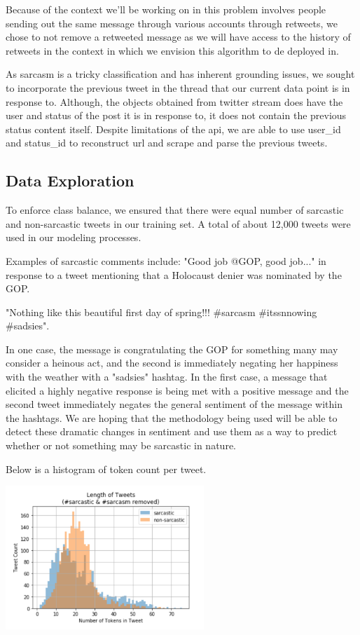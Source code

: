 \documentclass[11pt,a4paper]{article}
\begin{document}
Because of the context we'll be working on in this problem involves people sending out the same message through various accounts through retweets, we chose to not remove a retweeted message as we will have access to the history of retweets in the context in which we envision this algorithm to de deployed in.

As sarcasm is a tricky classification and has inherent grounding issues, we sought to incorporate the previous tweet in the thread that our current data point is in response to.   Although, the objects obtained from twitter stream does have the user and status of the post it is in response to, it does not contain the previous status content itself.  Despite limitations of the api, we are able to use user\_id and status\_id to reconstruct url and scrape and parse the previous tweets. 

\subsection{Data Exploration}
To enforce class balance, we ensured that there were equal number of sarcastic and non-sarcastic tweets in our training set. A total of about 12,000 tweets were used in our modeling processes.

Examples of sarcastic comments include:
 "Good job @GOP, good job..." in response to a tweet mentioning that a Holocaust denier was nominated by the GOP.   
 
 "Nothing like this beautiful first day of spring!!! \#sarcasm \#itssnnowing \#sadsies". 
 
 In one case, the message is congratulating the GOP for something many may consider a heinous act, and the second is immediately negating her happiness with the weather with a "sadsies" hashtag. In the first case, a message that elicited a highly negative response is being met with a positive message and the second tweet immediately negates the general sentiment of the message within the hashtags. We are hoping that the methodology being used will be able to detect these dramatic changes in sentiment and use them as a way to predict whether or not something may be sarcastic in nature.

Below is a histogram of token count per tweet.

\includegraphics[width=75mm,scale=0.5]{token_histogram.png}
\end{document}

